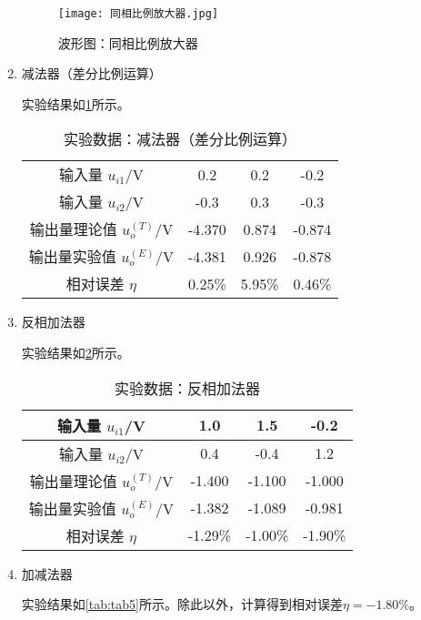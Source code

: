 \documentclass[dvipsnames, svgnames,a4paper,11pt]{article}
\begin{document}
\begin{enumerate}
		\begin{figure}[htbp]
			\centering
			\texttt{[image: 同相比例放大器.jpg]}
			\caption{波形图：同相比例放大器}
			\label{fig:fig2}
		\end{figure}	
		
		\item 减法器（差分比例运算）
		
		实验结果如\cref{tab:tab3}所示。
		
		\begin{table}[htbp]
			\centering
			\caption{实验数据：减法器（差分比例运算）}
			\label{tab:tab3}
			\begin{tabular}{|c|c|c|c|}
				\hline
				输入量 \( u_{i1} \)/V & 0.2 & 0.2 & -0.2 \\
				输入量 \( u_{i2} \)/V & -0.3 & 0.3 & -0.3 \\
				输出量理论值 \( u_o^{(T)} \)/V & -4.370 & 0.874 & -0.874 \\
				输出量实验值 \( u_o^{(E)} \)/V & -4.381 & 0.926 & -0.878 \\
				相对误差 \( \eta \) & 0.25\% & 5.95\% & 0.46\% \\
				\hline
			\end{tabular}
		\end{table}
		
		\item 反相加法器
		
		实验结果如\cref{tab:tab4}所示。
		
		\begin{table}[htbp]
			\centering
			\caption{实验数据：反相加法器}
			\label{tab:tab4}
			\begin{tabular}{|c|c|c|c|}
				\hline
				输入量 \( u_{i1} \)/V & 1.0 & 1.5 & -0.2 \\
				\hline
				输入量 \( u_{i2} \)/V & 0.4 & -0.4 & 1.2 \\
				\hline
				输出量理论值 \( u_o^{(T)} \)/V & -1.400 & -1.100 & -1.000 \\
				\hline
				输出量实验值 \( u_o^{(E)} \)/V & -1.382 & -1.089 & -0.981 \\
				\hline
				相对误差 \( \eta \) & -1.29\% & -1.00\% & -1.90\% \\
				\hline
			\end{tabular}
		\end{table}
		
		\item 加减法器
		
		实验结果如\cref{tab:tab5}所示。除此以外，计算得到相对误差$\eta=-1.80\%$。
		

\end{enumerate}
\end{document}
